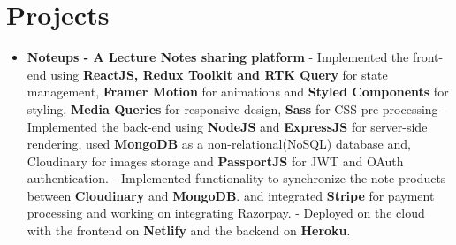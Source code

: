 \documentclass{article}
\begin{document}
\section*{Projects}
\begin{itemize}

    \item{\textbf{\large{Noteups - A Lecture Notes sharing platform} }}
          \newline
          \textmd{- Implemented the front-end using \textbf{ReactJS, Redux Toolkit and RTK Query} for state management, \textbf{Framer Motion} for animations and \textbf{Styled Components} for styling, \textbf{Media Queries} for responsive design, \textbf{Sass} for CSS pre-processing}
          \newline
          \textmd{- Implemented the back-end using \textbf{NodeJS} and \textbf{ExpressJS} for server-side rendering, used \textbf{MongoDB} as a non-relational(NoSQL) database and, Cloudinary for images storage and \textbf{PassportJS} for JWT and OAuth authentication.}
          \newline
          \textmd{- Implemented functionality to synchronize the note products between \textbf{Cloudinary} and \textbf{MongoDB}. and integrated \textbf{Stripe} for payment processing and working on integrating Razorpay.}
          \newline
          \textmd{- Deployed on the cloud with the frontend on \textbf{Netlify} and the backend on \textbf{Heroku}.}


\end{itemize}
\end{document}
